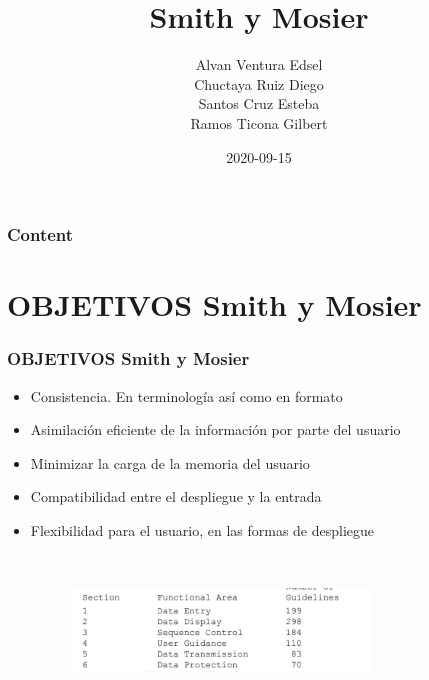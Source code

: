 \documentclass[11pt]{beamer}
\title[Smith y Mosier]{\bf\Huge Smith y Mosier  }
\author[]
{
    Alvan Ventura Edsel\inst{1}\\
	Chuctaya Ruiz Diego \inst{2}\\
	Santos Cruz Esteba \inst{3}\\
	Ramos Ticona Gilbert\inst{4}
}
\institute[UNSA]
{
\inst{1}%
System Engineering School\\
}
\date[2020-09-15]{\scriptsize{2020-09-15}}
\begin{document}
\begin{frame}
\titlepage
\end{frame}

\begin{frame}
\frametitle{Content}
\tableofcontents
\end{frame}

\section{OBJETIVOS Smith y Mosier}
\begin{frame}
\frametitle{OBJETIVOS Smith y Mosier}
\begin{itemize}
 \item Consistencia. En terminología así como en formato\\
 \item Asimilación eficiente de la información por parte del usuario\\
 \item Minimizar la carga de la memoria del usuario\\
 \item Compatibilidad entre el despliegue y la entrada\\
 \item Flexibilidad para el usuario, en las formas de despliegue


\begin{figure}[t]
\includegraphics[width=8cm, height=4cm]{SmithMosier.jpg}
\centering
\end{figure}
\end{itemize}
\end{frame}
\end{document}

